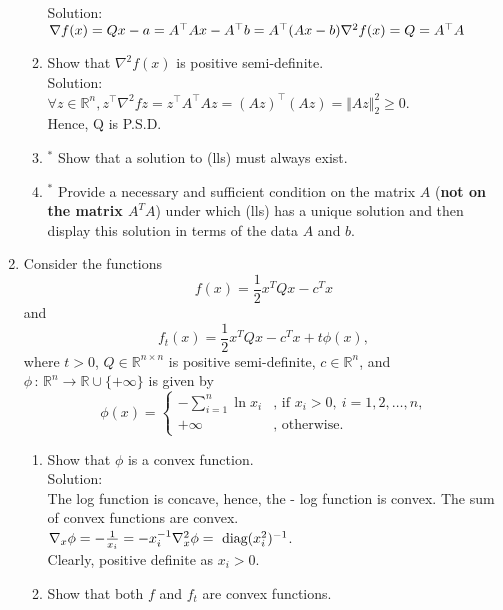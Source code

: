 \documentclass[12pt]{amsart}
\newcommand{\norm}[1]{\Vert #1 \Vert}
\newcommand{\R}{{\mathbb{R}}}
\newcommand{\grad}{\nabla}
\newcommand{\tpose}[1]{#1^{\scriptscriptstyle T}}
\begin{document}
\begin{enumerate}
\begin{enumerate}
\noindent
Solution: \\
$\grad f(x) = Qx - a = A^\top Ax - A^\top b = A^\top (Ax-b) \\
\grad^2 f(x) = Q = A^\top A$ \\

\item Show that $\grad^2 f(x)$ is positive semi-definite. \\

\noindent
Solution: \\
$ \forall z \in \mathbb{R}^n, z^\top \grad^2 f z = z^\top A^\top A z = (Az)^\top (Az) = \norm{Az}^2_2 \geq 0$.  \\
Hence, Q is P.S.D.  \\

\item$^*$ Show that a solution to (lls) must always exist.
\item$^*$ Provide a necessary and sufficient condition on the matrix
$A$ ({\bf not on the matrix $A^TA$}) under which (lls)
has a unique solution and then display this solution in terms
of the data $A$ and $b$.
\end{enumerate}
\item
Consider the functions
$$f(x)=\frac{1}{2} \tpose{x} Q x -\tpose{c}x $$
and
$$
f_t(x)=\frac{1}{2} \tpose{x} Q x -\tpose{c}x +t\phi(x),
$$
where $t>0$, $Q\in\R^{n\times n}$ is positive semi-definite,
$c\in\R^n$, and $\phi\, :\, \R^n\rightarrow\R\cup\{+\infty\}$
is given by
$$
\phi(x)=\left\{\begin{array}{ll}
-\sum_{i=1}^n\ln x_i&\mbox{, if $x_i> 0,\ i=1,2,\dots ,n$,}\\
+\infty&\mbox{, otherwise.}\end{array}\right.
$$
\begin{enumerate}
\item
Show that $\phi$ is a convex function. \\

\noindent
Solution:\\
The log function is concave, hence, the - log function is convex.  The sum of convex functions are convex. \\
$\grad_x \phi = -\frac{1}{x_i} = - x_i^{-1} \\
\grad_x^2 \phi = \text{ diag}(x_i^2)^{-1}$.\\
Clearly, positive definite as $x_i > 0$.  \\

\item
Show that both $f$ and $f_t$ are convex functions. \\


\end{enumerate}
\end{enumerate}
\end{document}
